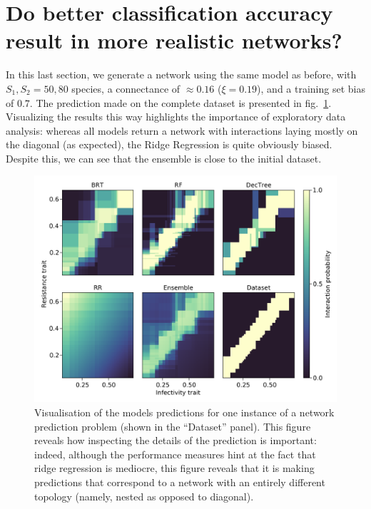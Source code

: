 \documentclass[11pt]{article}
\makeatletter
\def\maxwidth{\ifdim\Gin@nat@width>\linewidth\linewidth
\else\Gin@nat@width\fi}
\let\Oldincludegraphics\includegraphics
\renewcommand{\includegraphics}[1]{\Oldincludegraphics[width=\maxwidth]{#1}}
\makeatother
\begin{document}
\hypertarget{do-better-classification-accuracy-result-in-more-realistic-networks}{%
\section{Do better classification accuracy result in more realistic
networks?}\label{do-better-classification-accuracy-result-in-more-realistic-networks}}

In this last section, we generate a network using the same model as
before, with \(S_1, S_2 = 50, 80\) species, a connectance of
\(\approx 0.16\) (\(\xi = 0.19\)), and a training set bias of \(0.7\).
The prediction made on the complete dataset is presented in
fig.~\ref{fig:ecovalid}. Visualizing the results this way highlights the
importance of exploratory data analysis: whereas all models return a
network with interactions laying mostly on the diagonal (as expected),
the Ridge Regression is quite obviously biased. Despite this, we can see
that the ensemble is close to the initial dataset.

\begin{figure}
\hypertarget{fig:ecovalid}{%
\centering
\includegraphics{figures/valid_ensemble.png}
\caption{Visualisation of the models predictions for one instance of a
network prediction problem (shown in the ``Dataset'' panel). This figure
reveals how inspecting the details of the prediction is important:
indeed, although the performance measures hint at the fact that ridge
regression is mediocre, this figure reveals that it is making
predictions that correspond to a network with an entirely different
topology (namely, nested as opposed to diagonal).}\label{fig:ecovalid}
}
\end{figure}
\end{document}

